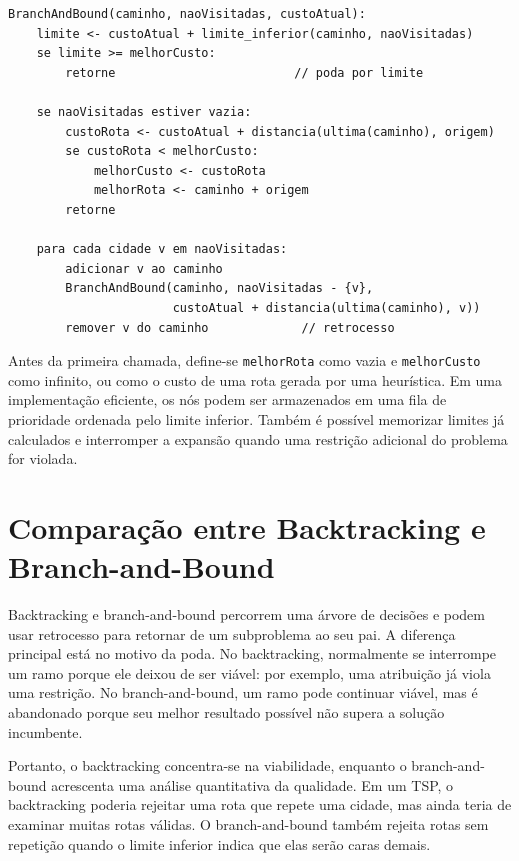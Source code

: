 \begin{verbatim}
BranchAndBound(caminho, naoVisitadas, custoAtual):
    limite <- custoAtual + limite_inferior(caminho, naoVisitadas)
    se limite >= melhorCusto:
        retorne                         // poda por limite

    se naoVisitadas estiver vazia:
        custoRota <- custoAtual + distancia(ultima(caminho), origem)
        se custoRota < melhorCusto:
            melhorCusto <- custoRota
            melhorRota <- caminho + origem
        retorne

    para cada cidade v em naoVisitadas:
        adicionar v ao caminho
        BranchAndBound(caminho, naoVisitadas - {v},
                       custoAtual + distancia(ultima(caminho), v))
        remover v do caminho             // retrocesso
\end{verbatim}

Antes da primeira chamada, define-se \texttt{melhorRota} como vazia e \texttt{melhorCusto} como infinito, ou como o custo de uma rota gerada por uma heurística. Em uma implementação eficiente, os nós podem ser armazenados em uma fila de prioridade ordenada pelo limite inferior. Também é possível memorizar limites já calculados e interromper a expansão quando uma restrição adicional do problema for violada.

\section{Comparação entre Backtracking e Branch-and-Bound}

Backtracking e branch-and-bound percorrem uma árvore de decisões e podem usar retrocesso para retornar de um subproblema ao seu pai. A diferença principal está no motivo da poda. No backtracking, normalmente se interrompe um ramo porque ele deixou de ser viável: por exemplo, uma atribuição já viola uma restrição. No branch-and-bound, um ramo pode continuar viável, mas é abandonado porque seu melhor resultado possível não supera a solução incumbente.

Portanto, o backtracking concentra-se na viabilidade, enquanto o branch-and-bound acrescenta uma análise quantitativa da qualidade. Em um TSP, o backtracking poderia rejeitar uma rota que repete uma cidade, mas ainda teria de examinar muitas rotas válidas. O branch-and-bound também rejeita rotas sem repetição quando o limite inferior indica que elas serão caras demais.

